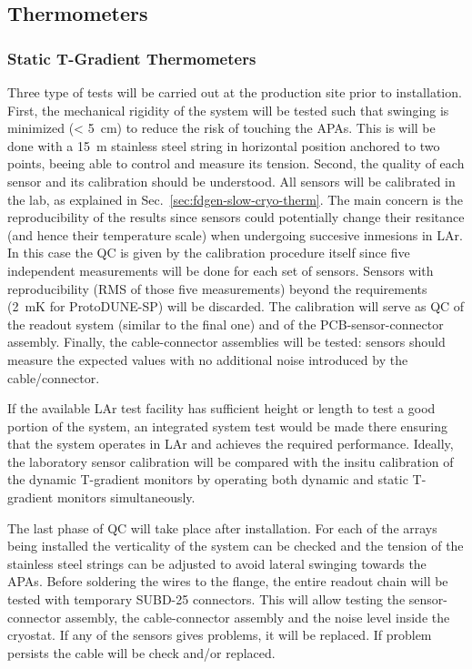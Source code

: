 \subsection{Thermometers}
\label{sec:fdgen-slow-cryo-qc-th}

\subsubsection{Static T-Gradient Thermometers}
\label{sec:fdgen-slow-cryo-qc-thst}


Three type of tests will be carried out at the production site prior to installation. First, the mechanical rigidity of the system will be tested such that swinging is minimized (< \SI{5}{cm})
to reduce the risk of touching the APAs. This is will be done with a \SI{15}{m} stainless steel string in horizontal position anchored to two points, beeing able to control and measure its tension. 
Second, the quality of each sensor and its calibration should be understood. All sensors will be calibrated in the lab, as explained in Sec.~\ref{sec:fdgen-slow-cryo-therm}.
The main concern is the reproducibility of the results since sensors could potentially change their resitance (and hence their temperature scale)
when undergoing succesive inmesions in LAr. In this case the QC is given by the calibration procedure itself since five independent measurements
will be done for each set of sensors. Sensors with reproducibility (RMS of those five measurements) beyond the requirements (\SI{2}{mK} for ProtoDUNE-SP) will be discarded.  
The calibration will serve as QC of the readout system (similar to the final one) and of the PCB-sensor-connector assembly. Finally, the cable-connector assemblies will
be tested: sensors should measure the expected values with no additional noise introduced by the cable/connector. 

If the available LAr test facility has sufficient height or length to test a good portion of the system, an integrated system test would be made there ensuring that the system
operates in LAr and achieves the required performance. Ideally, the laboratory sensor calibration will be compared with the insitu calibration
of the dynamic T-gradient monitors by operating both dynamic and static T-gradient monitors simultaneously.   

The last phase of QC will take place after installation. For each of the arrays being installed
the verticality of the system can be checked and the tension of the stainless steel strings can be adjusted to avoid lateral swinging towards the APAs. 
Before soldering the wires to the flange, the entire readout chain will be tested with temporary SUBD-25 connectors. 
This will allow testing the sensor-connector assembly, the cable-connector assembly and the noise level inside the cryostat.
If any of the sensors gives problems, it will be replaced. If problem persists the cable will be check and/or replaced.


